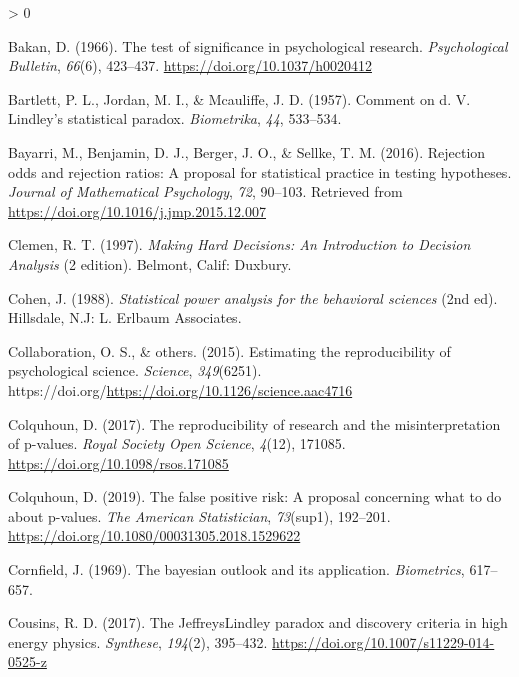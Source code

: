 \documentclass[
  english,
  ,man, a4paper,floatsintext]{apa6}
\newlength{\cslhangindent}
\newenvironment{CSLReferences}[2] %
 {%
  \setlength{\parindent}{0pt}
  \ifodd #1 \everypar{\setlength{\hangindent}{\cslhangindent}}\ignorespaces\fi
  \ifnum #2 > 0
  \setlength{\parskip}{#2\baselineskip}
  \fi
 }%
 {}
\begin{document}
\hypertarget{refs}{}
\begin{CSLReferences}{1}{0}
\leavevmode\hypertarget{ref-bakan_test_1966}{}%
Bakan, D. (1966). The test of significance in psychological research. \emph{Psychological Bulletin}, \emph{66}(6), 423--437. \url{https://doi.org/10.1037/h0020412}

\leavevmode\hypertarget{ref-bartlett1957comment}{}%
Bartlett, P. L., Jordan, M. I., \& Mcauliffe, J. D. (1957). Comment on d. V. Lindley's statistical paradox. \emph{Biometrika}, \emph{44}, 533--534.

\leavevmode\hypertarget{ref-bayarri2016rejection}{}%
Bayarri, M., Benjamin, D. J., Berger, J. O., \& Sellke, T. M. (2016). Rejection odds and rejection ratios: A proposal for statistical practice in testing hypotheses. \emph{Journal of Mathematical Psychology}, \emph{72}, 90--103. Retrieved from \url{https://doi.org/10.1016/j.jmp.2015.12.007}

\leavevmode\hypertarget{ref-clemen_making_1997}{}%
Clemen, R. T. (1997). \emph{Making {Hard} {Decisions}: {An} {Introduction} to {Decision} {Analysis}} (2 edition). Belmont, Calif: Duxbury.

\leavevmode\hypertarget{ref-cohen_statistical_1988}{}%
Cohen, J. (1988). \emph{Statistical power analysis for the behavioral sciences} (2nd ed). {Hillsdale, N.J}: {L. Erlbaum Associates}.

\leavevmode\hypertarget{ref-open2015estimating}{}%
Collaboration, O. S., \& others. (2015). Estimating the reproducibility of psychological science. \emph{Science}, \emph{349}(6251). https://doi.org/\url{https://doi.org/10.1126/science.aac4716}

\leavevmode\hypertarget{ref-colquhoun_reproducibility_2017}{}%
Colquhoun, D. (2017). The reproducibility of research and the misinterpretation of p-values. \emph{Royal Society Open Science}, \emph{4}(12), 171085. \url{https://doi.org/10.1098/rsos.171085}

\leavevmode\hypertarget{ref-colquhoun_false_2019}{}%
Colquhoun, D. (2019). The false positive risk: A proposal concerning what to do about p-values. \emph{The American Statistician}, \emph{73}(sup1), 192--201. \url{https://doi.org/10.1080/00031305.2018.1529622}

\leavevmode\hypertarget{ref-cornfield1969bayesian}{}%
Cornfield, J. (1969). The bayesian outlook and its application. \emph{Biometrics}, 617--657.

\leavevmode\hypertarget{ref-cousins_jeffreyslindley_2017}{}%
Cousins, R. D. (2017). The {Jeffreys}{{Lindley}} paradox and discovery criteria in high energy physics. \emph{Synthese}, \emph{194}(2), 395--432. \url{https://doi.org/10.1007/s11229-014-0525-z}


\end{CSLReferences}
\end{document}
